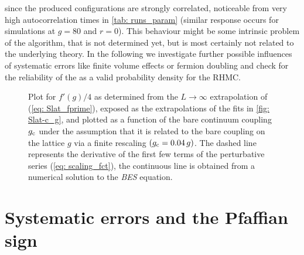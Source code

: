 since the produced configurations are strongly correlated, noticeable from very high autocorrelation times in \autoref{tab: runs_param} (similar response occurs for simulations at $g=80$ and $r=0$). This behaviour might be some intrinsic problem of the algorithm, that is not determined yet, but is most certainly not related to the underlying theory. In the following we investigate further possible influences of systematic errors like finite volume effects or fermion doubling and check for the reliability of the  as a valid probability density for the RHMC.
%
%
%
\begin{figure}
\centering

\caption{Plot for $f'(g)/4$ as determined from the $L\to\infty$ extrapolation of (\ref{eq: Slat_fprime}), exposed as the extrapolations of the fits in \autoref{fig: Slat-c_g}, and plotted as a function of the bare continuum coupling $g_{\rm c}$ under the assumption that it is related to the bare coupling on the lattice $g$ via a finite rescaling $(g_{\rm c}=0.04\, g)$. The dashed line represents the derivative of the first few terms of the perturbative series (\ref{eq: scaling_fct}), the continuous line is obtained from a numerical solution to the \textit{BES} equation.
\label{fig: f_prime_Lm4}}
\end{figure}
%
%
%
%
%
%
%
%
\section{Systematic errors and the Pfaffian sign}\label{sec: sys_errors}
%
